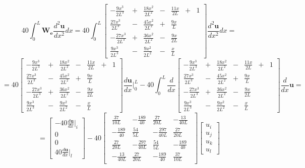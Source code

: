 $$40 \int_0^L \mathbf{W_e} \frac{d^2 \mathbf{u}}{dx^2} dx
=
40\int_0^L
\begin{bmatrix}
	-\frac{9x^3}{2L^3}&+&\frac{18x^2}{2L^2}&-&\frac{11x}{2L} &+& 1\\
	\frac{27x^3}{2L^3}&-&\frac{45x^2}{2L^2}&+&\frac{9x}{L}&&\\
	-\frac{27x^3}{2L^3}&+&\frac{36x^2}{2L^2}&-&\frac{9x}{2L}&&\\
	\frac{9x^3}{2L^3}&-&\frac{9x^2}{2L^2}&-&\frac{x}{L}&&
\end{bmatrix}
\frac{d^2 \mathbf{u}}{dx^2} dx
=
$$
$$
=
40
\begin{bmatrix}
	-\frac{9x^3}{2L^3}&+&\frac{18x^2}{2L^2}&-&\frac{11x}{2L} &+& 1\\
	\frac{27x^3}{2L^3}&-&\frac{45x^2}{2L^2}&+&\frac{9x}{L}&&\\
	-\frac{27x^3}{2L^3}&+&\frac{36x^2}{2L^2}&-&\frac{9x}{2L}&&\\
	\frac{9x^3}{2L^3}&-&\frac{9x^2}{2L^2}&-&\frac{x}{L}&&
\end{bmatrix}
\frac{d\mathbf{u}}{dx} |_0^L
  -40  \int_0^L \frac{d}{dx}
\begin{bmatrix}
	-\frac{9x^3}{2L^3}&+&\frac{18x^2}{2L^2}&-&\frac{11x}{2L} &+& 1\\
	\frac{27x^3}{2L^3}&-&\frac{45x^2}{2L^2}&+&\frac{9x}{L}&&\\
	-\frac{27x^3}{2L^3}&+&\frac{36x^2}{2L^2}&-&\frac{9x}{2L}&&\\
	\frac{9x^3}{2L^3}&-&\frac{9x^2}{2L^2}&-&\frac{x}{L}&&
\end{bmatrix}
\frac{d}{dx} \mathbf{u}
=$$
$$
=
\begin{bmatrix}
	  -40 \frac{d\mathbf{u}}{dx}|_i \\
	0\\
	0\\
40\frac{d\mathbf{u}}{dx}|_l
\end{bmatrix}
  -40 
\begin{bmatrix}
\begin{array}{rrrr}
	\frac{37}{10L} & -\frac{189}{40} & \frac{27}{20L} & -\frac{13}{40L}\\
	-\frac{189}{40} & \frac{54}{5L} & -\frac{297}{40L} & \frac{27}{20L}\\
	\frac{27}{20L} &  -\frac{297}{40L} & \frac{54}{5L} & -\frac{189}{40}\\
	-\frac{13}{40L} & \frac{27}{20L} & -\frac{189}{40} & \frac{37}{10L}
\end{array}
\end{bmatrix}
\begin{bmatrix}
u_i \\
u_j \\
u_k\\
u_l
\end{bmatrix}
$$




